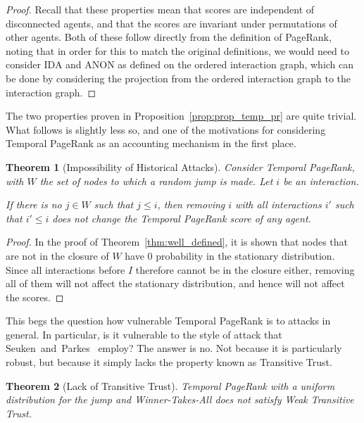\documentclass[a4paper,11pt]{book}
\newtheorem{theorem}{Theorem}
\theoremstyle{definition}
\begin{document}
\begin{proof}
    Recall that these properties mean that scores are independent of disconnected agents, and that
    the scores are invariant under permutations of other agents. Both of these follow directly
    from the definition of PageRank, noting that in order for this to match the original definitions,
    we would need to consider IDA and ANON as defined on the ordered interaction graph, which can
    be done by considering the projection from the ordered interaction graph to the interaction graph.
\end{proof}

The two properties proven in Proposition~\ref{prop:prop_temp_pr} are quite trivial. What follows
is slightly less so, and one of the motivations for considering Temporal PageRank as an accounting
mechanism in the first place.

\begin{theorem}[Impossibility of Historical Attacks]
    Consider Temporal PageRank, with $W$ the set of nodes to which a random jump is made. Let
    $i$ be an interaction.

    If there is no $j \in W$ such that $j \leq i$, then removing $i$ with all
    interactions $i'$ such that $i' \leq i$ does not change the Temporal PageRank
    score of any agent.
    \label{}
\end{theorem}

\begin{proof}
    In the proof of Theorem~\ref{thm:well_defined}, it is shown that nodes that are not in the closure
    of $W$ have $0$ probability in the stationary distribution. Since all interactions before $I$ therefore
    cannot be in the closure either, removing all of them will not affect the stationary distribution, and
    hence will not affect the scores.
\end{proof}

This begs the question how vulnerable Temporal PageRank is to attacks in general. In particular, is
it vulnerable to the style of attack that Seuken~and~Parkes~\cite{seuken2014Sybil} employ? The
answer is no. Not because it is particularly robust, but because it simply lacks the property
known as Transitive Trust.

\begin{theorem}[Lack of Transitive Trust]
    Temporal PageRank with a uniform distribution for the jump and Winner-Takes-All does not satisfy Weak Transitive Trust.
    \label{thm:no_trans_trust}
\end{theorem}
\end{document}
